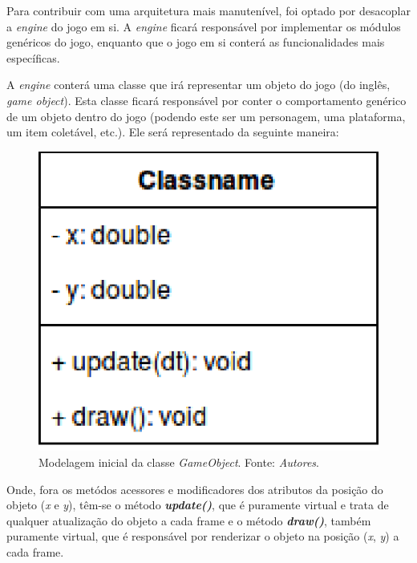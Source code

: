     Para contribuir com uma arquitetura mais manutenível, foi optado por desacoplar a \textit{engine} do jogo em si. A \textit{engine} ficará responsável por implementar os módulos genéricos do jogo, enquanto que o jogo em si conterá as funcionalidades mais específicas.

    A \textit{engine} conterá uma classe que irá representar um objeto do jogo (do inglês, \textit{game object}). Esta classe ficará responsável por conter o comportamento genérico de um objeto dentro do jogo (podendo este ser um personagem, uma plataforma, um item coletável, etc.). Ele será representado da seguinte maneira:

    \vspace{\onelineskip}

    \begin{figure}[H]
      \centering \includegraphics[keepaspectratio=true,scale=0.6]{figuras/game-object.eps}
      \caption[Modelagem inicial da classe \textit{GameObject}]
        {Modelagem inicial da classe \textit{GameObject}. Fonte: \textit{Autores}.}
      \label{game-object}
    \end{figure}

    Onde, fora os metódos acessores e modificadores dos atributos da posição do objeto (\textit{x} e \textit{y}), têm-se o método \textbf{\textit{update()}}, que é puramente virtual e trata de qualquer atualização do objeto a cada frame e o método \textbf{\textit{draw()}}, também puramente virtual, que é responsável por renderizar o objeto na posição (\textit{x}, \textit{y}) a cada frame.

